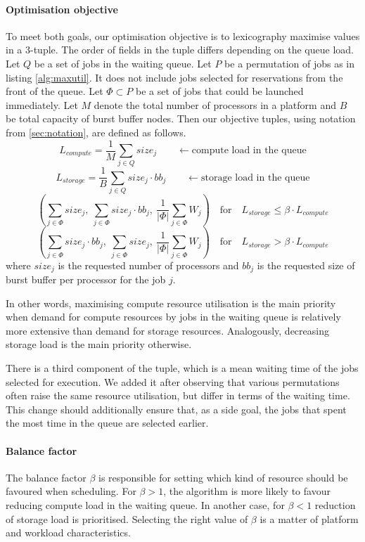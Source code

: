 \documentclass[thesis-en.tex]{subfiles}
\begin{document}
\paragraph{Optimisation objective}
To meet both goals, our optimisation objective is to lexicography maximise values in a 3-tuple. The order of fields in the tuple differs depending on the queue load. Let $Q$ be a set of jobs in the waiting queue. Let $P$ be a permutation of jobs as in listing \ref{alg:maxutil}. It does not include jobs selected for reservations from the front of the queue. Let $\Phi \subset P$ be a set of jobs that could be launched immediately. Let $M$ denote the total number of processors in a platform and $B$ be total capacity of burst buffer nodes. Then our objective tuples, using notation from \autoref{sec:notation}, are defined as follows.
\[ L_{compute} = \frac{1}{M} \sum_{j \in Q} size_j \qquad \leftarrow \text{compute load in the queue}\]
\[ L_{storage} = \frac{1}{B} \sum_{j \in Q} size_j \cdot bb_j \qquad \leftarrow \text{storage load in the queue}\]
\[ (\sum_{j \in \Phi} size_j,\ \sum_{j \in \Phi} size_j \cdot bb_j,\ \frac{1}{|\Phi|} \sum_{j \in \Phi} W_j) \quad \text{for} \quad L_{storage} \leq \beta \cdot L_{compute} \]
\[ (\sum_{j \in \Phi} size_j \cdot bb_j ,\ \sum_{j \in \Phi} size_j,\ \frac{1}{|\Phi|} \sum_{j \in \Phi} W_j) \quad \text{for} \quad L_{storage} > \beta \cdot L_{compute} \]
where $size_j$ is the requested number of processors and $bb_j$ is the requested size of burst buffer per processor for the job $j$.

In other words, maximising compute resource utilisation is the main priority when demand for compute resources by jobs in the waiting queue is relatively more extensive than demand for storage resources. Analogously, decreasing storage load is the main priority otherwise.

There is a third component of the tuple, which is a mean waiting time of the jobs selected for execution. We added it after observing that various permutations often raise the same resource utilisation, but differ in terms of the waiting time. This change should additionally ensure that, as a side goal, the jobs that spent the most time in the queue are selected earlier.

\paragraph{Balance factor}
The balance factor $\beta$ is responsible for setting which kind of resource should be favoured when scheduling. For $\beta > 1$, the algorithm is more likely to favour reducing compute load in the waiting queue. In another case, for $\beta < 1$ reduction of storage load is prioritised. Selecting the right value of $\beta$ is a matter of platform and workload characteristics.
\end{document}
